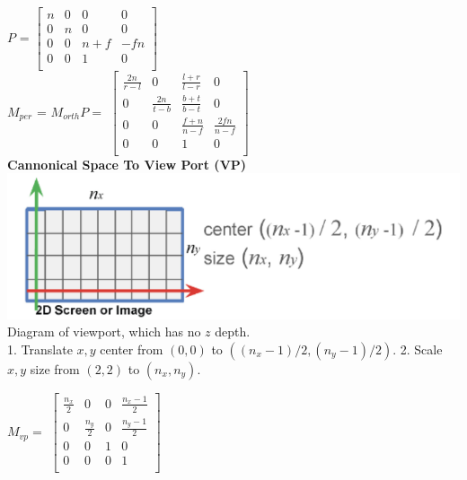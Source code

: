 \documentclass[letterpaper, 8pt]{extarticle}
\begin{document}
\begin{multicols*}{4}
$P$ =
\(
\begin{bmatrix}
    n & 0 & 0   & 0   \\
    0 & n & 0   & 0   \\
    0 & 0 & n+f & -fn \\
    0 & 0 & 1   & 0   \\
\end{bmatrix}
\)\\
$M_{per}$ = $M_{orth}P =$
\(
\begin{bmatrix}
    \frac{2n}{r-l} & 0              & \frac{l+r}{l-r} & 0               \\
    0              & \frac{2n}{t-b} & \frac{b+t}{b-t} & 0               \\
    0              & 0              & \frac{f+n}{n-f} & \frac{2fn}{n-f} \\
    0              & 0              & 1               & 0               \\
\end{bmatrix}
\)\\

\textbf{Cannonical Space To View Port (VP)}\\

\includegraphics[width=\linewidth]{viewport-diagram.png}
Diagram of viewport, which has no $z$ depth.\\
1. Translate $x,y$ center from $(0,0)$ to $((n_x-1)/2, (n_y-1)/2)$.
2. Scale $x,y$ size from $(2,2)$ to $(n_x, n_y)$.

$M_{vp} = $
\(
\begin{bmatrix}
    \frac{n_x}{2} & 0             & 0 & \frac{n_x-1}{2} \\
    0             & \frac{n_y}{2} & 0 & \frac{n_y-1}{2} \\
    0             & 0             & 1 & 0               \\
    0             & 0             & 0 & 1               \\
\end{bmatrix}
\)\\




\end{multicols*}
\end{document}
